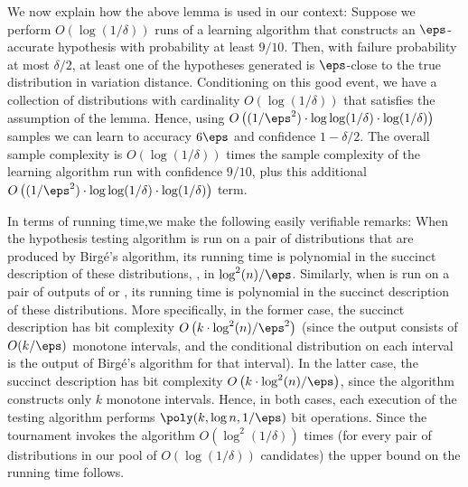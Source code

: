 We now explain how the above lemma is used in our context: Suppose we perform $O(\log(1/\delta))$ runs of a learning algorithm that constructs an $\eps$-accurate hypothesis with probability at least $9/10$.  Then, with failure probability at most $\delta/2$, at least one of the hypotheses generated is $\eps$-close to the true distribution in variation distance. Conditioning on this good event, we have a collection of distributions with cardinality $O(\log(1/\delta))$ that satisfies the assumption of the lemma. Hence, using
$O\left((1/\eps^2) \cdot \log\log(1/\delta) \cdot \log(1/\delta)\right) $ samples we can learn to accuracy
$6\eps$ and confidence $1-\delta/2$. The overall sample complexity is $O(\log(1/\delta))$ times the sample complexity of the 
{learning algorithm run with confidence $9/10$,} 
plus this additional $O\left((1/\eps^2) \cdot \log\log(1/\delta) \cdot \log(1/\delta)\right)$ term.

In terms of running time,we make the following easily verifiable remarks: When the hypothesis testing algorithm   is run on a pair of distributions that are produced by Birg{\'e}'s algorithm, its running time is polynomial in the succinct description of these distributions, \ie, in $\log^2(n) / \eps$. Similarly, when  is run on a pair of outputs of \hyperref[alg:learn-kmodal-simple]{} or \hyperref[alg:learn-kmodal]{}, its running time is polynomial in the succinct description of these distributions. More specifically, in the former case, the succinct description has bit complexity $O \left( k \cdot \log^2 (n) /\eps^2 \right)$ (since the output consists of $O(k/\eps)$ monotone intervals, and the conditional distribution on each interval is the output of Birg{\'e}'s algorithm for that interval). In the latter case, the succinct description has bit complexity
$O\left( k \cdot \log^2 (n) /\eps \right)$, since the algorithm \hyperref[alg:learn-kmodal]{} constructs  only $k$ monotone intervals. Hence, in both cases, each execution of the testing algorithm performs  $\poly(k, \log n , 1/\eps)$ bit operations. Since the tournament invokes the algorithm  $O(\log^2(1/\delta))$ times (for every pair of distributions in our pool of $O(\log(1/\delta))$ candidates) the upper bound on the running time follows.

